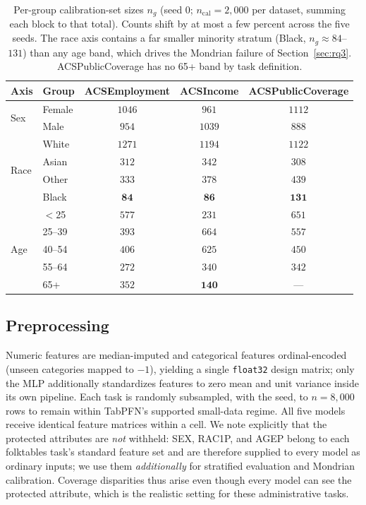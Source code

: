 \documentclass[review,12pt]{elsarticle}
\begin{document}
\begin{table}[t]
\centering
\caption{Per-group calibration-set sizes $n_g$ (seed 0; $n_{\mathrm{cal}}=2{,}000$ per dataset, summing each block to that total). Counts shift by at most a few percent across the five seeds. The race axis contains a far smaller minority stratum (Black, $n_g \approx 84$--$131$) than any age band, which drives the Mondrian failure of Section~\ref{sec:rq3}. ACSPublicCoverage has no 65+ band by task definition.}
\label{tab:groupsizes}
\small
\begin{tabular}{llccc}
\toprule
Axis & Group & ACSEmployment & ACSIncome & ACSPublicCoverage \\
\midrule
\multirow{2}{*}{Sex}  & Female & $1046$ & $961$  & $1112$ \\
                      & Male   & $954$  & $1039$ & $888$  \\
\midrule
\multirow{4}{*}{Race} & White  & $1271$ & $1194$ & $1122$ \\
                      & Asian  & $312$  & $342$  & $308$  \\
                      & Other  & $333$  & $378$  & $439$  \\
                      & Black  & $\mathbf{84}$ & $\mathbf{86}$ & $\mathbf{131}$ \\
\midrule
\multirow{5}{*}{Age}  & $<$25  & $577$  & $231$  & $651$  \\
                      & 25--39 & $393$  & $664$  & $557$  \\
                      & 40--54 & $406$  & $625$  & $450$  \\
                      & 55--64 & $272$  & $340$  & $342$  \\
                      & 65+    & $352$  & $\mathbf{140}$ & --- \\
\bottomrule
\end{tabular}
\end{table}

\subsection{Preprocessing}
Numeric features are median-imputed and categorical features ordinal-encoded (unseen categories mapped to $-1$), yielding a single \texttt{float32} design matrix; only the MLP additionally standardizes features to zero mean and unit variance inside its own pipeline. Each task is randomly subsampled, with the seed, to $n=8{,}000$ rows to remain within TabPFN's supported small-data regime. All five models receive identical feature matrices within a cell. We note explicitly that the protected attributes are \emph{not} withheld: SEX, RAC1P, and AGEP belong to each folktables task's standard feature set and are therefore supplied to every model as ordinary inputs; we use them \emph{additionally} for stratified evaluation and Mondrian calibration. Coverage disparities thus arise even though every model can see the protected attribute, which is the realistic setting for these administrative tasks.
\end{document}
